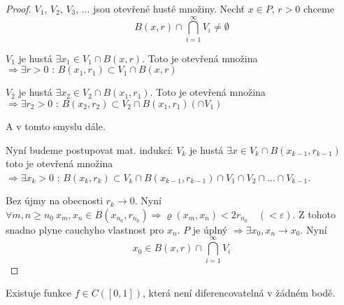 \begin{proof}
$V_1$, $V_2$, $V_3$, $\ldots$ jsou otevřené husté množiny. Nechť $x \in P$, $r > 0$ chceme 
$$B(x,r) \cap \bigcap_{i=1}^\infty V_i \neq \emptyset$$ 

$V_1$ je hustá $\exists x_1 \in V_1 \cap B(x,r)$. Toto je otevřená množina $\Rightarrow \exists r > 0 \textrm{ : } B(x_1, r_1) \subset V_1 \cap B(x,r)$

$V_2$ je hustá $\exists x_2 \in V_2 \cap B(x_1,r_1)$. Toto je otevřená množina $\Rightarrow \exists r_2 > 0 \textrm{ : } B(x_2, r_2) \subset V_2 \cap B(x_1,r_1) (\cap V_1)$

A v tomto smyslu dále.

Nyní budeme postupovat mat. indukcí: $V_k$ je hustá $\exists x \in V_k \cap B(x_{k-1}, r_{k-1})$ toto je otevřená množina $\Rightarrow \exists x_k > 0 \textrm{ : } B(x_k,r_k) \subset V_k \cap B(x_{k-1}, r_{k-1}) \cap V_1 \cap V_2 \cap \ldots \cap V_{k-1}$.

Bez újmy na obecnosti $r_k \to 0$. Nyní $\forall m,n \geq n_0 \ x_m,x_n \in B(x_{n_0}, r_{n_0}) \Rightarrow \varrho (x_m, x_n) < 2 r_{n_0} \quad (<\varepsilon)$.
Z tohoto snadno plyne cauchyho vlastnost pro $x_n$. $P$ je úplný $\Rightarrow \exists x_0, x_n \to x_0$. Nyní 
$$x_0 \in B(x,r) \cap \bigcap_{i=1}^\infty V_i$$
\end{proof}


\begin{vetat}
Existuje funkce $f \in C([0,1])$, která není diferencovatelná v žádném bodě.
\end{vetat}

